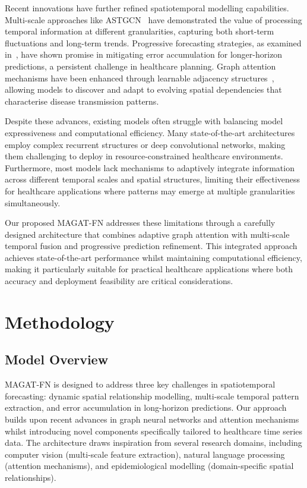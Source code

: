 \documentclass[lettersize, journal]{IEEEtran}
\begin{document}
Recent innovations have further refined spatiotemporal modelling capabilities. Multi-scale approaches like ASTGCN~\cite{astgcn} have demonstrated the value of processing temporal information at different granularities, capturing both short-term fluctuations and long-term trends. Progressive forecasting strategies, as examined in~\cite{progressive_forecasting}, have shown promise in mitigating error accumulation for longer-horizon predictions, a persistent challenge in healthcare planning. Graph attention mechanisms have been enhanced through learnable adjacency structures~\cite{adaptive_graph}, allowing models to discover and adapt to evolving spatial dependencies that characterise disease transmission patterns.

Despite these advances, existing models often struggle with balancing model expressiveness and computational efficiency. Many state-of-the-art architectures employ complex recurrent structures or deep convolutional networks, making them challenging to deploy in resource-constrained healthcare environments. Furthermore, most models lack mechanisms to adaptively integrate information across different temporal scales and spatial structures, limiting their effectiveness for healthcare applications where patterns may emerge at multiple granularities simultaneously.

Our proposed MAGAT-FN addresses these limitations through a carefully designed architecture that combines adaptive graph attention with multi-scale temporal fusion and progressive prediction refinement. This integrated approach achieves state-of-the-art performance whilst maintaining computational efficiency, making it particularly suitable for practical healthcare applications where both accuracy and deployment feasibility are critical considerations.

\section{Methodology}
\label{sec:methodology}

\subsection{Model Overview}
MAGAT-FN is designed to address three key challenges in spatiotemporal forecasting: dynamic spatial relationship modelling, multi-scale temporal pattern extraction, and error accumulation in long-horizon predictions. Our approach builds upon recent advances in graph neural networks and attention mechanisms whilst introducing novel components specifically tailored to healthcare time series data. The architecture draws inspiration from several research domains, including computer vision (multi-scale feature extraction), natural language processing (attention mechanisms), and epidemiological modelling (domain-specific spatial relationships).
\end{document}
